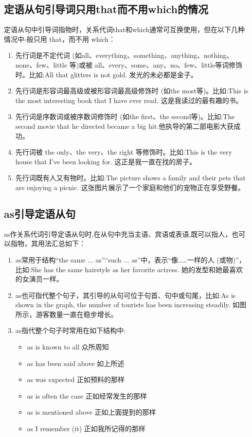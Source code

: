 \subsection{定语从句引导词只用that而不用which的情况}

定语从句中引导词指物时，关系代词that和which通常可互换使用，但在以下几种情况中-般只用 that，而不用 which：
\begin{enumerate}
  \item 先行词是不定代词 (如all、everything、something、anything、nothing、none、few、little 等)或被 all、every、some、any、no、few、little等词修饰时。比如:All that glitters is not gold. 发光的未必都是金子。
  \item 先行词是形容词最高级或被形容词最高级修饰时 (如the most等)。比如:This is the most interesting book that I have ever read. 这是我读过的最有趣的书。
  \item 先行词是序数词或被序数词修饰时 (如the first、the second等)。比如:The second movie that he directed became a big hit.他执导的第二部电影大获成功。
  \item 先行词被 the only、the very、the right 等修饰时。比如:This is the very house that I've been looking for. 这正是我一直在找的房子。
  \item 先行词既有人又有物时。比如:The picture shows a family and their pets that are enjoying a picnic. 这张图片展示了一个家庭和他们的宠物正在享受野餐。
\end{enumerate}

\subsection{as引导定语从句}

as作关系代词引导定语从句时,在从句中充当主语、宾语或表语,既可以指人，也可以指物，其用法汇总如下：
\begin{enumerate}
  \item as常用于结构“the same \(\ldots\) as”“such \(\ldots\) as”中，表示“像……一样的人 (或物)”，比如:She has the same hairstyle as her favorite actress. 她的发型和她最喜欢的女演员一样。
  \item as也可指代整个句子，其引导的从句可位于句首、句中或句尾，比如:As is shown in the graph, the number of tourists has been increasing steadily. 如图所示，游客数量一直在稳步增长。
  \item as指代整个句子时常用在如下结构中:
        \begin{itemize}
          \item as is known to all 众所周知
          \item as has been said above 如上所述
          \item as was expected 正如预料的那样
          \item as is often the case 正如经常发生的那样
          \item as is mentioned above 正如上面提到的那样
          \item as I remember (it) 正如我所记得的那样
        \end{itemize}
\end{enumerate}

